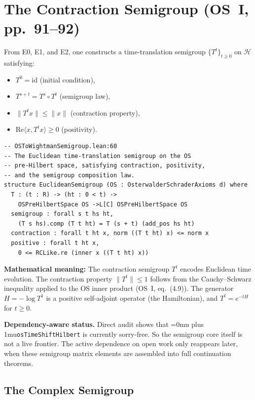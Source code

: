 \documentclass[11pt,a4paper]{article}
\newcommand{\leanname}[1]{\begingroup\Urlmuskip=0mu plus 1mu\relax\nolinkurl{#1}\endgroup}
\begin{document}
\section{The Contraction Semigroup (OS~I, pp.~91--92)}

From E0, E1, and E2, one constructs a time-translation semigroup
$\{T^t\}_{t \geq 0}$ on $\mathscr{H}$ satisfying:
\begin{itemize}
\item $T^0 = \mathrm{id}$ (initial condition),
\item $T^{s+t} = T^s \circ T^t$ (semigroup law),
\item $\|T^t x\| \leq \|x\|$ (contraction property),
\item $\mathrm{Re}\langle x, T^t x \rangle \geq 0$ (positivity).
\end{itemize}

\begin{lstlisting}
-- OSToWightmanSemigroup.lean:60
-- The Euclidean time-translation semigroup on the OS
-- pre-Hilbert space, satisfying contraction, positivity,
-- and the semigroup composition law.
structure EuclideanSemigroup (OS : OsterwalderSchraderAxioms d) where
  T : (t : R) -> (ht : 0 < t) ->
    OSPreHilbertSpace OS ->L[C] OSPreHilbertSpace OS
  semigroup : forall s t hs ht,
    (T s hs).comp (T t ht) = T (s + t) (add_pos hs ht)
  contraction : forall t ht x, norm ((T t ht) x) <= norm x
  positive : forall t ht x,
    0 <= RCLike.re (inner x ((T t ht) x))
\end{lstlisting}

\noindent\textbf{Mathematical meaning:} The contraction semigroup $T^t$ encodes
Euclidean time evolution. The contraction property $\|T^t\| \leq 1$ follows from
the Cauchy--Schwarz inequality applied to the OS inner product (OS~I, eq.~(4.9)).
The generator $H = -\log T^1$ is a positive self-adjoint operator (the Hamiltonian),
and $T^t = e^{-tH}$ for $t \geq 0$.

\medskip\noindent
\textbf{Dependency-aware status.}
Direct audit shows that \leanname{osTimeShiftHilbert} is currently sorry-free.
So the semigroup core itself is not a live frontier. The active dependence on
open work only reappears later, when these semigroup matrix elements are
assembled into full continuation theorems.

\subsection{The Complex Semigroup}
\end{document}
